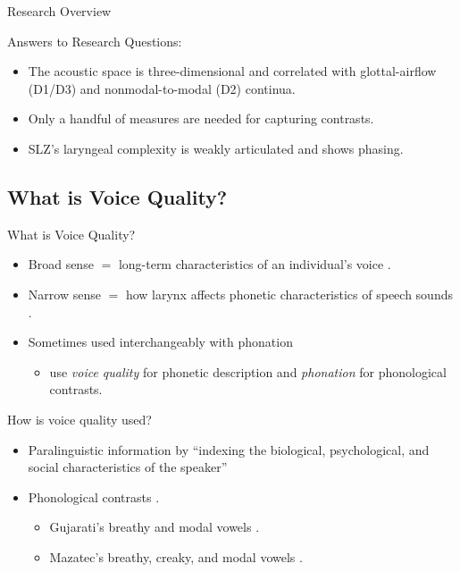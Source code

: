 \documentclass[professionalfonts]{beamer}
\begin{document}
\begin{frame}{Research Overview}
  \begin{block}{Answers to Research Questions:}
    \begin{itemize}
      \item The acoustic space is three-dimensional and correlated with glottal-airflow (D1/D3) and nonmodal-to-modal (D2) continua.
      \item Only a handful of measures are needed for capturing contrasts.
      \item SLZ's laryngeal complexity is weakly articulated and shows phasing. 
    \end{itemize}  
  \end{block}
\end{frame}

\subsection{What is Voice Quality?}

\begin{frame}{What is Voice Quality?}
  \begin{itemize}
  \item Broad sense $=$ long-term characteristics of an individual's voice \citep{abercrombieElementsGeneralPhonetics1967,laverPhoneticDescriptionVoice1980}.
  \item Narrow sense $=$ how larynx affects phonetic characteristics of speech sounds \citep[e.g.,][]{eslingVoiceQualityLaryngeal2019}.
  \item Sometimes used interchangeably with phonation
    \begin{itemize}
      \item \cite{barzilaiContextdependentPhoneticEnhancement2021} use \textit{voice quality} for phonetic description and \textit{phonation} for phonological contrasts.
    \end{itemize}
  \end{itemize}
\end{frame}

\begin{frame}{How is voice quality used?}
  \begin{itemize}
    \item Paralinguistic information by ``indexing the biological, psychological, and social characteristics of the speaker'' \citep[e.g.,][]{laverVoiceQualityIndexical1968,podesvaStanceWindowLanguageRace2016}
    \item Phonological contrasts \citep[e.g.,][]{espositoCrosslinguisticPatternsPhonation2020}.
    \begin{itemize}
      \item Gujarati's breathy and modal vowels \citep{fischer-jorgensenPhoneticAnalysisBreathy1968}.
      \item Mazatec's breathy, creaky, and modal vowels \citep{silvermanLaryngealComplexityOtomanguean1997}.
    \end{itemize}
  \end{itemize}
\end{frame}
\end{document}
